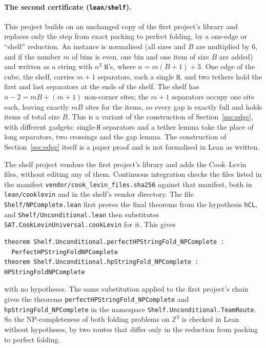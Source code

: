 \documentclass[11pt,letterpaper]{article}
\theoremstyle{definition}
\theoremstyle{remark}
\newcommand{\Hh}{\mathtt{H}}
\newcommand{\lean}[1]{\texttt{#1}}
\newcommand{\Z}{\mathbb{Z}}
\begin{document}
\paragraph{The second certificate (\lean{lean/shelf}).}
This project builds on an unchanged copy of the first project's library and replaces only the step
from exact packing to perfect folding, by a one-edge or ``shelf'' reduction. An instance is
normalised (all sizes and $B$ are multiplied by $6$, and if the number $m$ of bins is even, one bin and
one item of size $B$ are added) and written as a string with $n^3$ $\Hh$'s, where $n=m(B+1)+3$. One edge
of the cube, the shelf, carries $m+1$ separators, each a single $\Hh$, and two tethers hold the first
and last separators at the ends of the shelf. The shelf has $n-2=mB+(m+1)$ non-corner sites; the
$m+1$ separators occupy one site each, leaving exactly $mB$ sites for the items, so every gap is
exactly full and holds items of total size $B$. This is a variant of the construction of
Section~\ref{sec:edge}, with different gadgets: single-$\Hh$ separators and a tether lemma take the
place of long separators, two crossings and the gap lemma. The construction of
Section~\ref{sec:edge} itself is a paper proof and is not formalised in Lean as written.

The shelf project vendors the first project's library and adds the Cook--Levin files, without
editing any of them. Continuous integration checks the files listed in the manifest
\lean{vendor/cook\_levin\_files.sha256} against that manifest, both in \lean{lean/cooklevin} and in
the shelf's vendor directory. The file \lean{Shelf/NPComplete.lean} first proves the final theorems from the hypothesis
\lean{hCL}, and \lean{Shelf/Unconditional.lean} then substitutes \lean{SAT.CookLevinUniversal.cookLevin}
for it. This gives
{\small
\begin{verbatim}
theorem Shelf.Unconditional.perfectHPStringFold_NPComplete :
  PerfectHPStringFoldNPComplete
theorem Shelf.Unconditional.hpStringFold_NPComplete : HPStringFoldNPComplete
\end{verbatim}
}
\noindent with no hypotheses. The same substitution applied to the first project's chain gives the
theorems \lean{perfectHPStringFold\_NPComplete} and \lean{hpStringFold\_NPComplete} in the namespace
\lean{Shelf.Unconditional.TeamRoute}. So the NP-completeness of both
folding problems on $\Z^3$ is checked in Lean without hypotheses, by two routes that differ only in
the reduction from packing to perfect folding.
\end{document}
